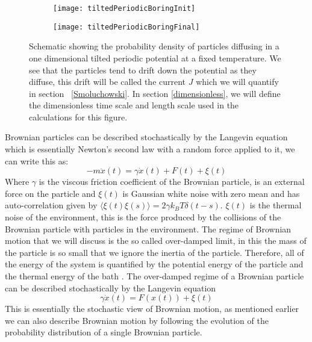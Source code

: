 \begin{figure}[tb]
	\begin{subfigure}{0.49\textwidth}
		\texttt{[image: tiltedPeriodicBoringInit]}
		\caption{\label{fig:Init}}
	\end{subfigure}
\begin{subfigure}{0.49\textwidth}
		\texttt{[image: tiltedPeriodicBoringFinal]}
		\caption{\label{fig:Final}}
\end{subfigure}
\caption{Schematic showing the probability density of particles diffusing in a one dimensional tilted periodic potential at a fixed temperature. We see that the particles tend to drift down the potential as they diffuse, this drift will be called the current $J$ which we will quantify in section ~\autoref{Smoluchowski}. In section \ref{dimensionless}, we will define the dimensionless time scale and length scale used in the calculations for this figure.}
\label{fig:Schematic}
\end{figure}

Brownian particles can be described stochastically by the Langevin equation which is essentially Newton's second law with a random force applied to it, we can write this as:
\begin{equation}
-m \ddot{x}(t) = \gamma \dot{x} (t) + F(t) + \xi(t) 
\end{equation}
Where $\gamma$ is the viscous friction coefficient of the Brownian particle, is an external force on the particle and $\xi(t)$ is Gaussian white noise with zero mean and has auto-correlation given by $\langle \xi(t) \xi(s) \rangle = 2 \gamma k_B T \delta(t - s)$. $\xi(t)$ is the thermal noise of the environment, this is the force produced by the collisions of the Brownian particle with particles in the environment.
The regime of Brownian motion that we will discuss is the so called over-damped limit, in this the mass of the particle is so small that we ignore the inertia of the particle. Therefore, all of the energy of the system is quantified by the potential energy of the particle and the thermal energy of the bath \cite{Streater1997,Streater1997a,Streater2000,Streater1997b}. The over-damped regime of a Brownian particle can be described stochastically by the Langevin equation 
\begin{equation}
	\gamma \dot x(t) = F(x(t)) + \xi(t)  \label{eqn:langevin}
\end{equation}
This is essentially the stochastic view of Brownian motion, as mentioned earlier we can also describe Brownian motion by following the evolution of the probability distribution of a single Brownian particle.

